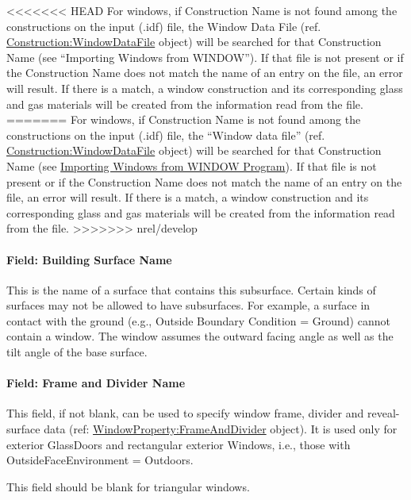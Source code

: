 <<<<<<< HEAD
For windows, if Construction Name is not found among the constructions on the input (.idf) file, the Window Data File (ref. \hyperref[constructionwindowdatafile]{Construction:WindowDataFile} object) will be searched for that Construction Name (see ``Importing Windows from WINDOW''). If that file is not present or if the Construction Name does not match the name of an entry on the file, an error will result. If there is a match, a window construction and its corresponding glass and gas materials will be created from the information read from the file.
=======
For windows, if Construction Name is not found among the constructions on the input (.idf) file, the ``Window data file'' (ref. \hyperref[constructionwindowdatafile]{Construction:WindowDataFile} object) will be searched for that Construction Name (see \hyperref[importing-windows-from-window-program]{Importing Windows from WINDOW Program}). If that file is not present or if the Construction Name does not match the name of an entry on the file, an error will result. If there is a match, a window construction and its corresponding glass and gas materials will be created from the information read from the file.
>>>>>>> nrel/develop

\paragraph{Field: Building Surface Name}\label{field-building-surface-name-000}

This is the name of a surface that contains this subsurface. Certain kinds of surfaces may not be allowed to have subsurfaces. For example, a surface in contact with the ground (e.g., Outside Boundary Condition = Ground) cannot contain a window. The window assumes the outward facing angle as well as the tilt angle of the base surface.

\paragraph{Field: Frame and Divider Name}\label{field-frame-and-divider-name}

This field, if not blank, can be used to specify window frame, divider and reveal-surface data (ref: \hyperref[windowpropertyframeanddivider]{WindowProperty:FrameAndDivider} object). It is used only for exterior GlassDoors and rectangular exterior Windows, i.e., those with OutsideFaceEnvironment = Outdoors.

This field should be blank for triangular windows.

